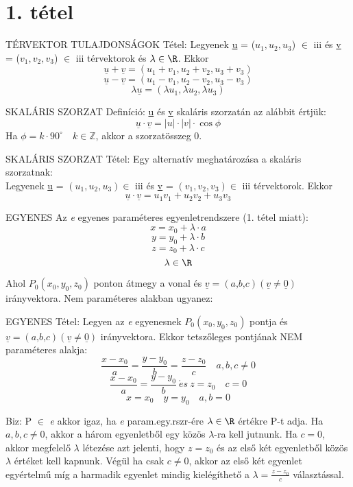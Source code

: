 \section{1. tétel}

\begin{framed}
TÉRVEKTOR TULAJDONSÁGOK Tétel: Legyenek \underline{u} = ($u_1, u_2, u_3$) $\in$ \Rn{3} és \underline{v} = ($v_1, v_2, v_3$) $\in$ \Rn{3} térvektorok és $\lambda \in \R$. Ekkor\\
$$\underline{u} + \underline{v} = (u_1 + v_1, u_2 + v_2, u_3 + v_3)$$
$$\underline{u} - \underline{v} = (u_1 - v_1, u_2 - v_2, u_3 - v_3)$$
$$\lambda \underline{u} = (\lambda u_1,\lambda u_2, \lambda u_3)$$
\end{framed}
\begin{shaded}
SKALÁRIS SZORZAT Definíció: \underline{u} és \underline{v} skaláris szorzatán az alábbit értjük:
$$\underline{u}\cdot\underline{v} = |u|\cdot|v|\cdot\cos\phi$$
Ha $\phi = k\cdot90^{\circ}\quad k\in\mathbb{Z}$, akkor a szorzatösszeg 0.
\end{shaded}
\begin{framed}
SKALÁRIS SZORZAT Tétel: Egy alternatív meghatározása a skaláris szorzatnak: \\Legyenek \underline{u} = $(u_1, u_2, u_3)\in$ \Rn{3} és \underline{v} = $(v_1, v_2, v_3)\in$ \Rn{3} térvektorok. Ekkor $$\underline{u}\cdot\underline{v} = u_1 v_1 + u_2 v_2 + u_3 v_3$$
\end{framed}
\begin{framed}
EGYENES Az \textit{e} egyenes paraméteres egyenletrendszere (1. tétel miatt):
$$x = x_0 + \lambda \cdot a$$
$$y = y_0 + \lambda \cdot b$$
$$z = z_0 + \lambda \cdot c$$
$$\lambda \in \R$$
\end{framed}
Ahol $P_0 (x_0,y_0,z_0)$ ponton átmegy a vonal és $\underline{v} = (\textit{a,b,c})  (\underline{v} \neq \underline{0})$ irányvektora.
Nem paraméteres alakban ugyanez:
\begin{framed}
EGYENES Tétel: Legyen az \textit{e} egyenesnek $P_0 (x_0,y_0,z_0)$ pontja és $\underline{v} = (\textit{a,b,c})  (\underline{v} \neq \underline{0})$ irányvektora. Ekkor tetszőleges pontjának NEM paraméteres alakja:
$$\frac{x-x_0}{a} = \frac{y-y_0}{b} = \frac{z-z_0}{c}\quad a, b, c \neq 0$$
$$\frac{x-x_0}{a} = \frac{y-y_0}{b} \:\acute{e}s\: z = z_0 \quad c = 0$$
$$x = x_0\quad y = y_0\quad a,b = 0$$
\end{framed}
\begin{leftbar}
Biz: P $\in$ \textit{e} akkor igaz, ha \textit{e} param.egy.rszr-ére $\lambda \in \R$ értékre P-t adja. Ha $a,b,c \neq 0$, akkor a három egyenletből egy közös $\lambda$-ra kell jutnunk. Ha $c=0$, akkor megfelelő $\lambda$ létezése azt jelenti, hogy $z=z_0$ és az első két egyenletből közös $\lambda$ értéket kell kapnunk. Végül ha csak $c\neq0$, akkor az első két egyenlet egyértelmű míg a harmadik egyenlet mindig kielégíthető a $\lambda = \frac{z-z_0}{c}$ választással.
\end{leftbar}
